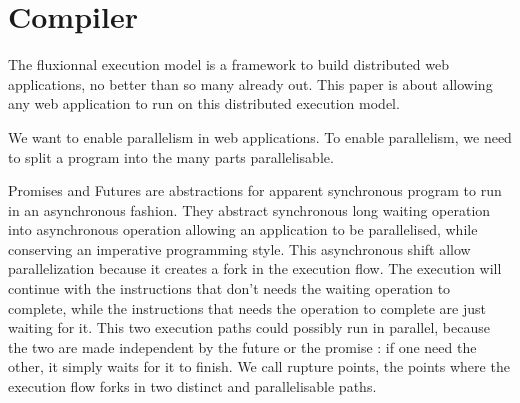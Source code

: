 \section{Compiler} \label{section:compiler}

The fluxionnal execution model is a framework to build distributed web applications, no better than so many already out.
This paper is about allowing any web application to run on this distributed execution model.

We want to enable parallelism in web applications.
To enable parallelism, we need to split a program into the many parts parallelisable.

Promises and Futures are abstractions for apparent synchronous program to run in an asynchronous fashion.
They abstract synchronous long waiting operation into asynchronous operation allowing an application to be parallelised, while conserving an imperative programming style.
This asynchronous shift allow parallelization because it creates a fork in the execution flow.
The execution will continue with the instructions that don't needs the waiting operation to complete, while the instructions that needs the operation to complete are just waiting for it.
This two execution paths could possibly run in parallel, because the two are made independent by the future or the promise : if one need the other, it simply waits for it to finish.
We call rupture points, the points where the execution flow forks in two distinct and parallelisable paths.






